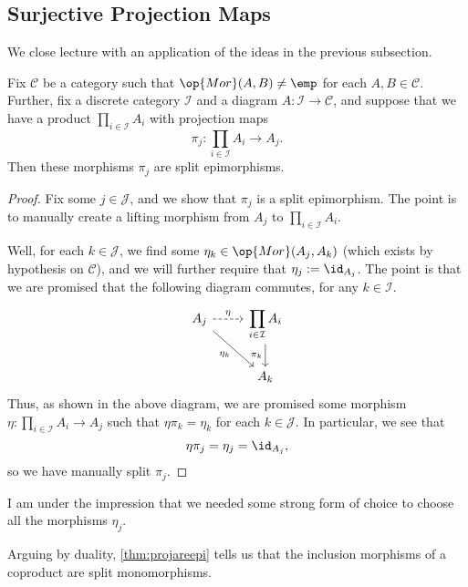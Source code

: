 \documentclass[../notes.tex]{subfiles}
\begin{document}
\subsection{Surjective Projection Maps}
We close lecture with an application of the ideas in the previous subsection.
\begin{theorem} \label{thm:projareepi}
	Fix $\mathcal C$ be a category such that $\op{Mor}(A,B)\ne\emp$ for each $A,B\in\mathcal C$. Further, fix a discrete category $\mathcal I$ and a diagram $A:\mathcal I\to\mathcal C$, and suppose that we have a product $\prod_{i\in\mathcal I}A_i$ with projection maps
	\[\pi_j:\prod_{i\in\mathcal I}A_i\to A_j.\]
	Then these morphisms $\pi_j$ are split epimorphisms.
\end{theorem}
\begin{proof}
	Fix some $j\in\mathcal J$, and we show that $\pi_j$ is a split epimorphism. The point is to manually create a lifting morphism from $A_j$ to $\prod_{i\in\mathcal I}A_i$.
	
	Well, for each $k\in\mathcal J$, we find some $\eta_k\in\op{Mor}(A_j,A_k)$ (which exists by hypothesis on $\mathcal C$), and we will further require that $\eta_j:=\id_{A_j}$. The point is that we are promised that the following diagram commutes, for any $k\in\mathcal I$.
	\[\begin{tikzcd}
		{A_j} & {\displaystyle\prod_{i\in\mathcal I}A_i} \\
		& {A_k}
		\arrow["{\pi_k}"', from=1-2, to=2-2]
		\arrow["\eta", dashed, from=1-1, to=1-2]
		\arrow["{\eta_k}"', from=1-1, to=2-2]
	\end{tikzcd}\]
	Thus, as shown in the above diagram, we are promised some morphism $\eta:\prod_{i\in\mathcal I}A_i\to A_j$ such that $\eta\pi_k=\eta_k$ for each $k\in\mathcal J$. In particular, we see that
	\[\eta\pi_j=\eta_j=\id_{A_j},\]
	so we have manually split $\pi_j$.
\end{proof}
\begin{remark}[Nir]
	I am under the impression that we needed some strong form of choice to choose all the morphisms $\eta_j$.
\end{remark}
\begin{remark}
	Arguing by duality, \autoref{thm:projareepi} tells us that the inclusion morphisms of a coproduct are split monomorphisms.
\end{remark}
\end{document}
